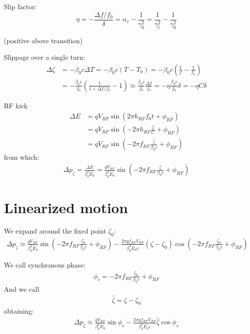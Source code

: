 Slip factor:
\begin{equation}
\eta = -\frac{\Delta f/f_0}{\delta} = \alpha_c - \frac{1}{\gamma_0^2}
= \frac{1}{\gamma_t^2}- \frac{1}{\gamma_0^2}
\end{equation}

(positive above transition)

Slippage over a single turn:
\begin{align}
\Delta \zeta 
& = -\beta_0 c \Delta T 
= -\beta_0 c (T - T_0) 
= -\beta_0 c \left(\frac{1}{f} - \frac{1}{f_0}\right) \\
&= -\frac{\beta_0 c}{f_0} \left(\frac{1}{1 + {\Delta f}/{f_0}} - 1\right)
\simeq \frac{\beta_0 c}{f_0}\frac{\Delta f}{f_0}
= -\eta \frac{\beta_0 c}{f_0}\delta
= -\eta C \delta
\end{align}

RF kick
\begin{align}
\Delta E
& = q V_{RF} \sin\left( 2 \pi h_{RF} f_0 t + \phi_{RF} \right)\\
& = q V_{RF} \sin\left(-2 \pi h_{RF} \frac{\zeta}{C} + \phi_{RF} \right)\\
& = q V_{RF} \sin\left(-2 \pi f_{RF} \frac{\zeta}{\beta_0 c} + \phi_{RF} \right)
\end{align}
from which:
\begin{align}
\Delta p_\zeta = \frac{\Delta E}{\beta_0^2E_0} 
= \frac{q V_{RF}}{\beta_0^2E_0}\sin\left(-2 \pi f_{RF} \frac{\zeta}{\beta_0 c} + \phi_{RF}\right)
\end{align}

\section{Linearized motion}

We expand around the fixed point $\zeta_0$:
\begin{align}
\Delta p_\zeta \approx \frac{q V_{RF}}{\beta_0^2E_0}\sin\left(-2 \pi f_{RF} \frac{\zeta_0}{\beta_0 c} + \phi_{RF}\right) -\frac{2\pi q f_{RF}V_{RF}}{\beta_0^3 E_0 c}(\zeta-\zeta_0)\cos\left(-2\pi f_{RF} \frac{\zeta_0}{\beta_0 c} + \phi_{RF}\right)
\end{align}

We call synchronous phase:
\begin{align}
\phi_s = -2 \pi f_{RF} \frac{\zeta_0}{\beta_0 c} + \phi_{RF}
\end{align}
And we call 
\begin{align}
\hat{\zeta}= \zeta - \zeta_0
\end{align}
obtaining:
\begin{align}
\Delta p_\zeta \approx \frac{q V_{RF}}{\beta_0^2E_0}\sin{\phi_s} -\frac{2\pi q f_{RF} V_{RF}}{\beta_0^3 E_0 c}\hat{\zeta}\cos{\phi_s}
\end{align}

